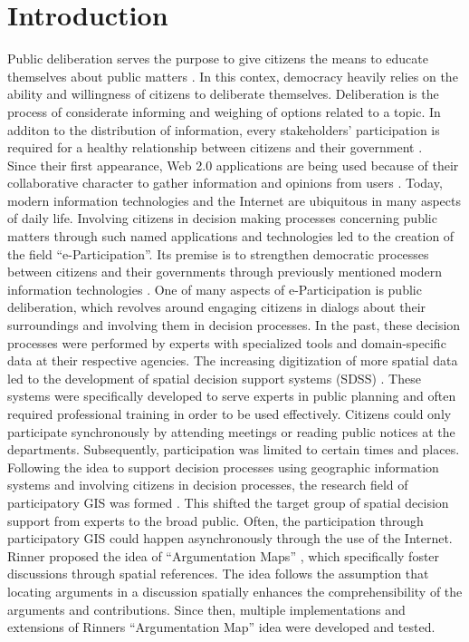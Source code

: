 \section{Introduction}
\label{chap:introduction}
Public deliberation serves the purpose to give citizens the means to educate themselves about public matters \cite{page1996deliberates}. In this contex, democracy heavily relies on the ability and willingness of citizens to deliberate themselves. Deliberation is the process of considerate informing and weighing of options related to a topic. In additon to the distribution of information, every stakeholders' participation is required for a healthy relationship between citizens and their government \cite{Arnstein1969_citizen_participation}.\\
Since their first appearance, Web 2.0 applications are being used because of their collaborative character to gather information and opinions from users \cite{o2007web}. Today, modern information technologies and the Internet are ubiquitous in many aspects of daily life. Involving citizens in decision making processes concerning public matters through such named applications and technologies led to the creation of the field ``e-Participation''. Its premise is to strengthen democratic processes between citizens and their governments through previously mentioned modern information technologies \cite{Saebo_eParticipation, Medaglia2012_eParticipation}. One of many aspects of e-Participation is public deliberation, which revolves around engaging citizens in dialogs about their surroundings and involving them in decision processes. In the past, these decision processes were performed by experts with specialized tools and domain-specific data at their respective agencies. The increasing digitization of more spatial data led to the development of spatial decision support systems (SDSS) \cite{densham_sdss}. These systems were specifically developed to serve experts in public planning and often required professional training in order to be used effectively. Citizens could only participate synchronously by attending meetings or reading public notices at the departments. Subsequently, participation was limited to certain times and places.\\
Following the idea to support decision processes using geographic information systems and involving citizens in decision processes, the research field of participatory GIS was formed \cite{Macintosh2004_eParticipation_characterization,Sieber2006_PublicParticipationGIS}. This shifted the target group of spatial decision support from experts to the broad public. Often, the participation through participatory GIS could happen asynchronously through the use of the Internet. Rinner proposed the idea of ``Argumentation Maps'' \cite{Rinner_ArgumentationMaps}, which specifically foster discussions through spatial references. The idea follows the assumption that locating arguments in a discussion spatially enhances the comprehensibility of the arguments and contributions. Since then, multiple implementations and extensions of Rinners ``Argumentation Map'' idea were developed and tested.\\
